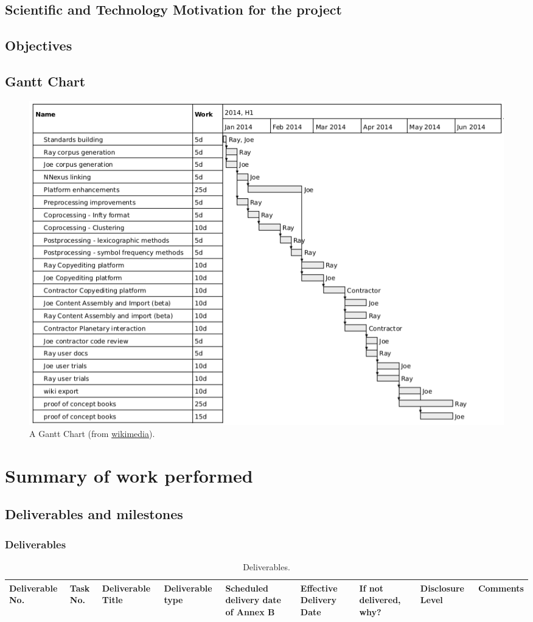 \documentclass{ani-intermediate}
\begin{document}
\section{Scientific and Technology Motivation for the project}
\section{Objectives}
\section{Gantt Chart}

\begin{figure}[!htp]
  \includegraphics[width=1\textwidth]{images/gantt.png}
  \caption{A Gantt Chart (from \href{https://commons.wikimedia.org/wiki/File:Planetmathbooks_gantt.png}{wikimedia}).}
\end{figure}

\chapter{Summary of work performed}
\lipsum[5-9]


  \section{Deliverables and milestones}
  \subsection{Deliverables}
  \lipsum[10-12]

  \begin{table}
    \center
    \scriptsize
    \begin{tabular}{|p{}|p{}|p{}|p{}|p{}|p{}|p{}|p{}|p{}|}
      \hline
      Deliverable No. & Task No. & Deliverable Title & Deliverable type & Scheduled delivery date of Annex B & Effective Delivery Date & If not delivered, why? & Disclosure Level & Comments \\ \hline
    \end{tabular}
    \caption{Deliverables.}
  \end{table}
\end{document}
